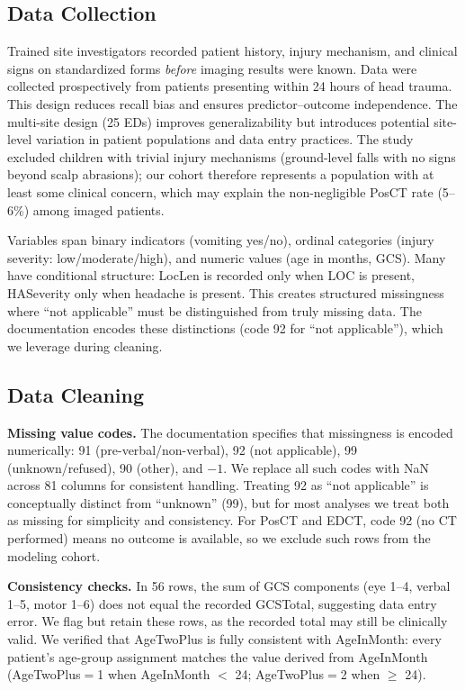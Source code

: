 \documentclass[11pt,letterpaper]{article}
\begin{document}
\subsection{Data Collection}\label{data-collection}

Trained site investigators recorded patient history, injury mechanism, and clinical signs on standardized forms \emph{before} imaging results were known. Data were collected prospectively from patients presenting within 24 hours of head trauma. This design reduces recall bias and ensures predictor--outcome independence. The multi-site design (25 EDs) improves generalizability but introduces potential site-level variation in patient populations and data entry practices. The study excluded children with trivial injury mechanisms (ground-level falls with no signs beyond scalp abrasions); our cohort therefore represents a population with at least some clinical concern, which may explain the non-negligible PosCT rate (5--6\%) among imaged patients.

Variables span binary indicators (vomiting yes/no), ordinal categories (injury severity: low/moderate/high), and numeric values (age in months, GCS). Many have conditional structure: LocLen is recorded only when LOC is present, HASeverity only when headache is present. This creates structured missingness where ``not applicable'' must be distinguished from truly missing data. The documentation encodes these distinctions (code 92 for ``not applicable''), which we leverage during cleaning.

\subsection{Data Cleaning}\label{data-cleaning}

\textbf{Missing value codes.} The documentation specifies that missingness is encoded numerically: 91 (pre-verbal/non-verbal), 92 (not applicable), 99 (unknown/refused), 90 (other), and $-1$. We replace all such codes with NaN across 81 columns for consistent handling. Treating 92 as ``not applicable'' is conceptually distinct from ``unknown'' (99), but for most analyses we treat both as missing for simplicity and consistency. For PosCT and EDCT, code 92 (no CT performed) means no outcome is available, so we exclude such rows from the modeling cohort.

\textbf{Consistency checks.} In 56 rows, the sum of GCS components (eye 1--4, verbal 1--5, motor 1--6) does not equal the recorded GCSTotal, suggesting data entry error. We flag but retain these rows, as the recorded total may still be clinically valid. We verified that AgeTwoPlus is fully consistent with AgeInMonth: every patient's age-group assignment matches the value derived from AgeInMonth (AgeTwoPlus$=$1 when AgeInMonth $<$ 24; AgeTwoPlus$=$2 when $\ge$ 24).
\end{document}
